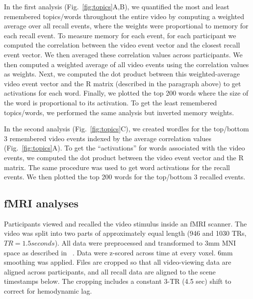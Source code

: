 \documentclass{article}
\begin{document}
In the first analysis (Fig.~\ref{fig:topics}A,B), we quantified the most and least remembered topics/words throughout the entire video by computing a weighted average over all recall events, where the weights were proportional to memory for each recall event. To measure memory for each event, for each participant we computed the correlation between the video event vector and the closest recall event vector. We then averaged these correlation values across participants. We then computed a weighted average of all video events using the correlation values as weights. Next, we computed the dot product between this weighted-average video event vector and the R matrix (described in the paragraph above) to get activations for each word. Finally, we plotted the top 200 words where the size of the word is proportional to its activation. To get the least remembered topics/words, we performed the same analysis but inverted memory weights.

In the second analysis (Fig.~\ref{fig:topics}C), we created wordles for the top/bottom 3 remembered video events indexed by the average correlation values (Fig.~\ref{fig:topics}A).  To get the ``activations'' for words associated with the video events, we computed the dot product between the video event vector and the R matrix. The same procedure was used to get word activations for the recall events. We then plotted the top 200 words for the top/bottom 3 recalled events.

\subsection*{fMRI analyses}
Participants viewed and recalled the video stimulus inside an fMRI scanner. The video was split into two parts of approximately equal length (946 and 1030 TRs, $TR=1.5 seconds$). All data were preprocessed and transformed to 3mm MNI space as described in ~\citep{ChenEtal17}. Data were z-scored across time at every voxel. 6mm smoothing was applied.
Files are cropped so that all video-viewing data are aligned across participants, and all recall data are aligned to the scene timestamps below. The cropping includes a constant 3-TR (4.5 sec) shift to correct for hemodynamic lag.
\end{document}
